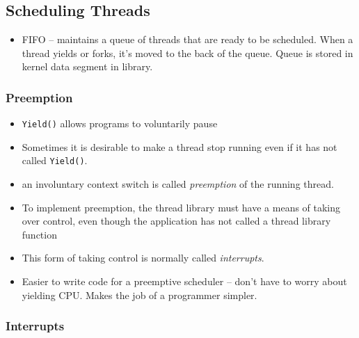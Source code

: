 \documentclass[12pt]{article}
\begin{document}
\subsection{Scheduling Threads}

\begin{itemize}
    \item FIFO -- maintains a queue of threads that are ready to be scheduled.
        When a thread yields or forks, it's moved to the back of the queue.
        Queue is stored in kernel data segment in library.
\end{itemize}

\subsubsection{Preemption}

\begin{itemize}
    \item \texttt{Yield()} allows programs to voluntarily pause
    \item Sometimes it is desirable to make a thread stop running even if it
        has not called \texttt{Yield()}.
    \item an involuntary context switch is called \textit{preemption} of the
        running thread.
    \item To implement preemption, the thread library must have a means of
        taking over control, even though the application has not called a thread
        library function
    \item This form of taking control is normally called \textit{interrupts}.
    \item Easier to write code for a preemptive scheduler -- don't have to worry
        about yielding CPU. Makes the job of a programmer simpler.
\end{itemize}

\subsubsection{Interrupts}
\end{document}
